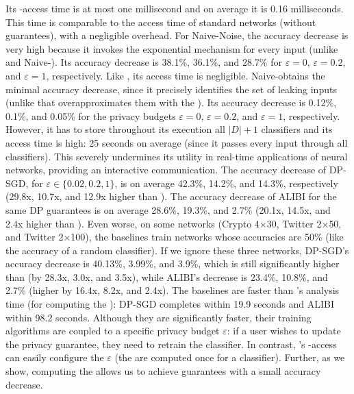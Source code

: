 {Its \propi-access time is at most one millisecond and on average it is 0.16 milliseconds.
This time is comparable to the access time of standard networks (without \propi guarantees), with a negligible overhead. %
For Naive-Noise, the accuracy decrease is very high because it invokes the exponential mechanism for every input (unlike \tool and Naive-\propi). Its accuracy decrease is 
  38.1\%, 36.1\%, and 28.7\% for $\varepsilon=0$, $\varepsilon=0.2$, and $\varepsilon=1$, respectively. Like \tool, its access time is negligible.  
Naive-\propi obtains the minimal accuracy decrease, since it precisely identifies the set of leaking inputs (unlike \tool that overapproximates them with the \propa). Its accuracy decrease is 
  0.12\%, 0.1\%, and 0.05\% for the privacy budgets $\varepsilon=0$, $\varepsilon=0.2$, and $\varepsilon=1$, respectively. 
  However, it has to store throughout its execution all $|D|+1$ classifiers and its access time is high: 25 seconds on average (since it passes every input through all classifiers). This severely undermines its utility in real-time applications of neural networks, providing an interactive communication. 
The accuracy decrease of DP-SGD, for $\varepsilon\in\{0.02,0.2,1\}$, is on average 42.3\%, 14.2\%, and 14.3\%, respectively (29.8x, 10.7x, and 12.9x higher than \tool). 
The accuracy decrease of ALIBI for the same DP guarantees is on average 28.6\%, 19.3\%, and 2.7\% (20.1x, 14.5x, and 2.4x higher than \tool). 
Even worse, on some networks (Crypto 4$\times$30, Twitter 2$\times$50, and Twitter 2$\times$100), the baselines train networks whose accuracies are 50\% (like the accuracy of a random classifier).  
If we ignore these three networks, DP-SGD's accuracy decrease is 40.13\%, 3.99\%, and 3.9\%, which is still significantly higher than \tool (by 28.3x, 3.0x, and 3.5x), while ALIBI's decrease is 23.4\%, 10.8\%, and 2.7\% (higher by 16.4x, 8.2x, and 2.4x). 
The baselines are faster than \tool's analysis time (for computing the \propa): %
DP-SGD completes within 19.9 seconds and ALIBI within 98.2 seconds. 
Although they are significantly faster, their training algorithms are coupled to a specific privacy budget $\varepsilon$: if a user wishes to update the privacy guarantee, they need to retrain the classifier. In contrast, \tool's \propi-access can easily configure the $\varepsilon$ (the \propa are computed once for a classifier).
Further, as we show, computing the \propa allows us to achieve \propi guarantees with a small accuracy decrease. %
}{
}
